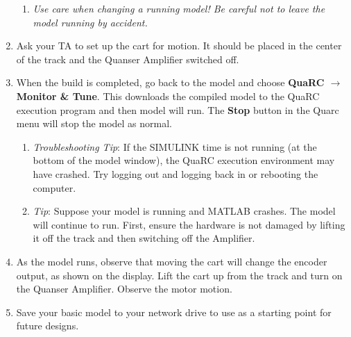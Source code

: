 \documentclass[11pt,letterpaper]{article}
\newcommand{\baro}{\pmb{\rightarrow}}
\begin{document}
\begin{enumerate}
\begin{enumerate}
    \item \textit{Use care when changing a running model! Be careful not to leave the model running by accident.}
  \end{enumerate}
  \item Ask your TA to set up the cart for motion. It should be placed in the center of the track and the Quanser Amplifier switched off.
  \item When the build is completed, go back to the model and choose \textbf{QuaRC $\baro$ Monitor \& Tune}. This downloads the compiled model to the QuaRC execution program and then model will run. The \textbf{Stop} button in the Quarc menu will stop the model as normal.
  \begin{enumerate}
    \item \textit{Troubleshooting Tip}: If the SIMULINK time is not running (at the bottom of the model window), the QuaRC execution environment may have crashed. Try logging out and logging back in or rebooting the computer.
    \item \textit{Tip}: Suppose your model is running and MATLAB crashes. The model will continue to run. First, ensure the hardware is not damaged by lifting it off the track and then switching off the Amplifier.
    
  \end{enumerate}
  \item As the model runs, observe that moving the cart will change the encoder output, as shown on the display. Lift the cart up from the track and turn on the Quanser Amplifier. Observe the motor motion.
  \item Save your basic model to your network drive to use as a starting point for future designs.
\end{enumerate}
\end{document}
